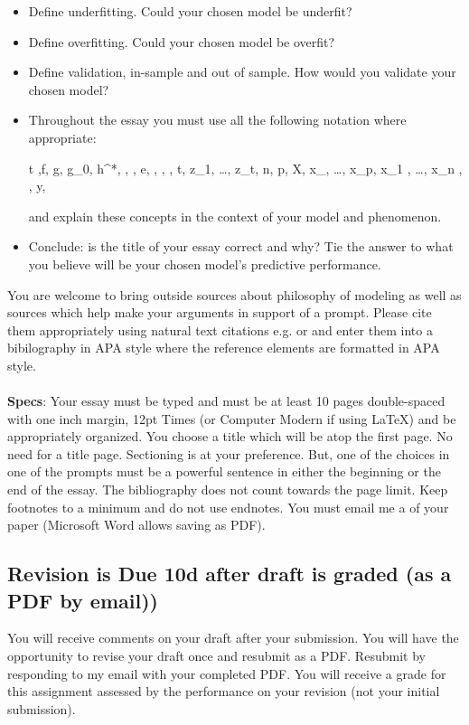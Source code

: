 \documentclass[12pt]{article}
\begin{document}
\begin{itemize}
\item Define underfitting. Could your chosen model be underfit? 
\item Define overfitting. Could your chosen model be overfit? 
\item Define validation, in-sample and out of sample. How would you validate your chosen model?
\item Throughout the essay you must use all the following notation where appropriate:

\beqn
t ,f, g, g_0, h^*, \delta, , e, , , , t, z_1, \ldots, z_t, n, p, X, x_{}, \ldots, x_{\cdot p}, x_{1 \cdot}, \ldots, x_{n \cdot}, , y, 
\eeqn

and explain these concepts in the context of your model and phenomenon.

\item Conclude: is the title of your essay correct and why? Tie the answer to what you believe will be your  chosen model's predictive performance.
\end{itemize}

You are welcome to bring outside sources about philosophy of modeling as well as sources which help make your arguments in support of a prompt. Please cite them appropriately using natural text citations e.g.  or  and enter them into a bibilography in APA style where the reference elements are formatted in APA style.\\
~\\
\textbf{Specs}: Your essay must be typed and must be at least 10 pages double-spaced with one inch margin, 12pt Times (or Computer Modern if using \LaTeX) and be appropriately organized. You choose a title which will be atop the first page. No need for a title page. Sectioning is at your preference. But, one of the choices in one of the prompts must be a powerful sentence in either the beginning or the end of the essay. The bibliography does not count towards the page limit. Keep footnotes to a minimum and do not use endnotes. You must email me a   of your paper (Microsoft Word allows saving as PDF).

\subsection*{Revision is Due 10d after draft is graded (as a PDF by email))}

You will receive comments on your draft after your submission. You will have the opportunity to revise your draft once and resubmit as a PDF. Resubmit by responding to my email with your completed PDF. You will receive a grade for this assignment assessed by the performance on your revision (not your initial submission).

\end{document}
